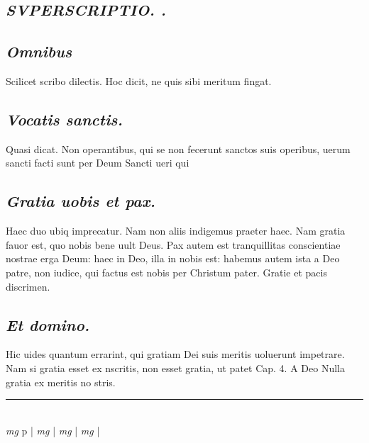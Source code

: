 \documentclass{article}
\begin{document}
\begin{pages}
\subsection*{\textit{SVPERSCRIPTIO. . }}
{}
\subsection*{\textit{Omnibus }}\pstart Scilicet scribo dilectis. Hoc dicit, ne quis sibi meritum fingat.   \pend
{}
{}
\subsection*{\textit{Vocatis sanctis. }}\pstart Quasi dicat. Non operantibus, qui se non fecerunt sanctos suis operibus, uerum sancti facti sunt per Deum Sancti ueri qui  \pend
{}
{}
\subsection*{\textit{Gratia uobis et pax. }}\pstart Haec duo ubiq imprecatur. Nam non aliis indigemus praeter haec. Nam gratia fauor est, quo nobis bene uult Deus. Pax autem est tranquillitas conscientiae nostrae erga Deum: haec in Deo, illa in nobis est: habemus autem ista a Deo patre, non iudice, qui factus est nobis per Christum pater.  Gratie et pacis discrimen.   \pend
{}
{}
\subsection*{\textit{Et domino. }}\pstart Hic uides quantum errarint, qui gratiam Dei suis meritis uoluerunt impetrare. Nam si gratia esset ex nscritis, non esset gratia, ut patet Cap. 4. A Deo Nulla gratia ex meritis no stris.  \pend
\vspace{0.5cm}\noindent
\vspace{0.2cm}\rule{1cm}{0.2pt}\\ 
\hspace{0.2cm}\textit{mg}
\footnotesize p 
\normalsize| 
\hspace{0.2cm}\textit{mg}
\footnotesize 
\normalsize| 
\hspace{0.2cm}\textit{mg}
\footnotesize 
\normalsize| 
\hspace{0.2cm}\textit{mg}
\footnotesize 
\normalsize| 

\end{pages}
\end{document}
